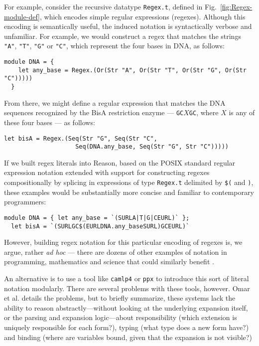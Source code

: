 \documentclass[acmsmall,review]{acmart}
\newcommand{\li}[1]{\lstinline[basicstyle=\ttfamily\fontsize{9pt}{1em}\selectfont]{#1}}
\theoremstyle{slplain}
\numberwithin{thm}{section}
\begin{document}
For example, consider the recursive datatype \li{Regex.t}, defined in Fig.~\ref{fig:Regex-module-def}, which encodes simple regular expressions (regexes). Although this encoding is semantically useful, the induced notation is syntactically verbose and unfamiliar. For example, we would construct a regex that matches the strings \li{"A"}, \li{"T"}, \li{"G"} or \li{"C"}, which represent the four bases in DNA, as follows:
\begin{lstlisting}[numbers=none]
  module DNA = { 
    let any_base = Regex.(Or(Str "A", Or(Str "T", Or(Str "G", Or(Str "C")))))
  }
\end{lstlisting}
From there, we might define a regular expression that matches the DNA sequences recognized by the BisA restriction enzyme --- \li{GC}$X$\li{GC}, where $X$ is any of these four bases --- as follows:
\begin{lstlisting}[numbers=none]
  let bisA = Regex.(Seq(Str "G", Seq(Str "C", 
                    Seq(DNA.any_base, Seq(Str "G", Str "C")))))
\end{lstlisting}

If we built regex literals into Reason, based on the POSIX standard regular expression notation extended with support for constructing regexes compositionally by splicing in expressions of type \li{Regex.t} delimited by \li{$(} and \li{)}, these examples would be substantially more concise and familiar to contemporary programmers:
\begin{lstlisting}[numbers=none]
  module DNA = { let any_base = `(SURLA|T|G|CEURL)` };
  let bisA = `(SURLGC$(EURLDNA.any_baseSURL)GCEURL)`
\end{lstlisting}

However, building regex notation for this particular encoding of regexes is, we argue, rather \emph{ad hoc} --- there are dozens of other examples of notation in programming, mathematics and science that could similarly benefit \cite{cites,from,paper}. 

An alternative is to use a tool like \li{camlp4} or \li{ppx} to introduce this sort of literal notation modularly. There are several problems with these tools, however. Omar et al. \cite{TLMs-paper} details the problems, but to briefly summarize, these systems lack the ability to reason abstractly---without looking at the underlying expansion itself, or the parsing and expansion logic---about responsibility (which extension is uniquely responsible for each form?), typing (what type does a new form have?) and binding (where are variables bound, given that the expansion is not visible?)
\end{document}
